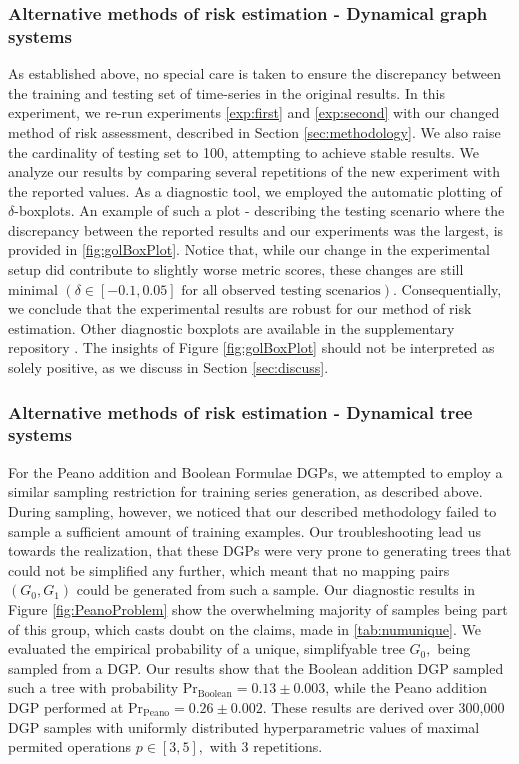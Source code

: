 \subsubsection{Alternative methods of risk estimation - Dynamical graph systems}
\label{exp:our2}
As established above, no special care is taken to ensure the discrepancy between the training and testing set of time-series in the original results. In this experiment, we re-run experiments \ref{exp:first} and \ref{exp:second} with our changed method of risk assessment, described in Section \ref{sec:methodology}. We also raise the cardinality of testing set to 100, attempting to achieve stable results. We analyze our results by comparing several repetitions of the new experiment with the reported values. As a diagnostic tool, we employed the automatic plotting of $\delta$-boxplots. An example of such a plot - describing the testing scenario where the discrepancy between the reported results and our experiments was the largest, is provided in \ref{fig:golBoxPlot}. Notice that, while our change in the experimental setup did contribute to slightly worse metric scores, these changes are still minimal $(\delta \in [-0.1, 0.05]\text{ for all observed testing scenarios}).$ Consequentially, we conclude that the experimental results are robust for our method of risk estimation. Other diagnostic boxplots are available in the supplementary repository \cite{Git}. The insights of Figure \ref{fig:golBoxPlot} should not be interpreted as solely positive, as we discuss in Section \ref{sec:discuss}.



\subsubsection{Alternative methods of risk estimation - Dynamical tree systems}
\label{exp:our3}
For the Peano addition and Boolean Formulae DGPs, we attempted to employ a similar sampling restriction for training series generation, as described above. During sampling, however, we noticed that our described methodology failed to sample a sufficient amount of training examples. Our troubleshooting lead us towards the realization, that these DGPs were very prone to generating trees that could not be simplified any further, which meant that no mapping pairs $(G_{0}, G_{1})$ could be generated from such a sample. Our diagnostic results in Figure \ref{fig:PeanoProblem} show the overwhelming majority of samples being part of this group, which casts doubt on the claims, made in \ref{tab:numunique}. We evaluated the empirical probability of a unique, simplifyable tree $G_{0},$ being sampled from a DGP. Our results show that the Boolean addition DGP sampled such a tree with probability $\text{Pr}_\text{Boolean}=0.13 \pm 0.003$, while the Peano addition DGP performed at $\text{Pr}_\text{Peano}=0.26 \pm 0.002$. These results are derived over 300,000 DGP samples with uniformly distributed hyperparametric values of maximal permited operations $p \in [3, 5],$ with 3 repetitions.

